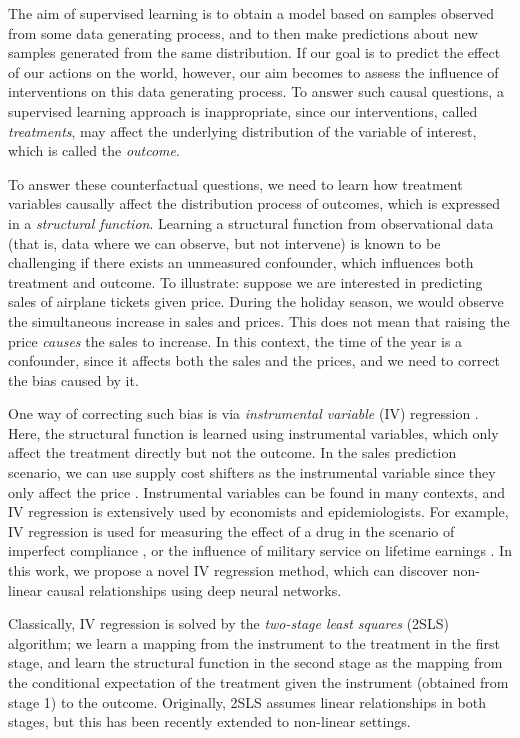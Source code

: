The aim of supervised learning is to obtain a model
based on samples observed from some data generating process, and
to then make  predictions about new samples generated from the same
distribution.
If our goal is to predict the effect of our actions on the world, however, our aim becomes to assess the influence of interventions on this data generating process. To answer such causal questions, a supervised learning approach is inappropriate, since our interventions, called {\it treatments}, may affect the underlying distribution of the variable of interest, which is called the {\it outcome}. 

To answer these counterfactual questions, we need to learn how treatment variables causally affect the distribution process of outcomes, which is expressed in a {\it structural function}. Learning a structural function
from observational data (that is, data where we can observe, but not intervene)
is known to be challenging if there exists an unmeasured confounder, which influences both treatment and outcome. To illustrate: suppose we are interested in predicting sales of airplane tickets given price. During the holiday season, we would observe the simultaneous increase in sales and prices. This does not mean that raising the price {\it causes} the sales to increase. In this context, the time of the year is a confounder, since it affects both the sales and the prices, and we need to correct the bias caused by it.

One way of correcting such bias is via {\it instrumental variable} (IV) regression \citep{James2003}. Here, the structural function is learned using instrumental variables, which only affect the treatment directly but not the outcome. In the sales prediction scenario, we can use supply cost shifters as the instrumental variable since they only affect the price \citep{Wright1928, Blundell2012}. Instrumental variables can be found in many contexts, and IV regression is extensively used by economists and epidemiologists. For example, IV regression is used for measuring the effect of a drug in the scenario of imperfect compliance \citep{Angeris1996}, or the influence of military service on lifetime earnings \citep{Angeris1990}. In this work, we propose a novel IV regression method, which can discover non-linear causal relationships using deep neural networks.

Classically, IV regression is solved by the {\it two-stage least squares} (2SLS) algorithm; we learn a mapping from the instrument to the treatment in the first stage, and learn the structural function in the second stage as the mapping from the conditional expectation of the treatment given the instrument (obtained from stage 1) to the outcome. Originally, 2SLS assumes linear relationships in both stages, but this has been recently extended to non-linear settings.

